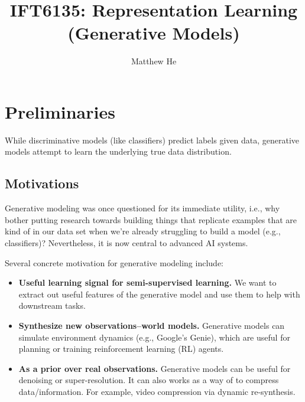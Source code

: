 \documentclass{mytufte-light}
\title{IFT6135: Representation Learning \\\qquad\qquad\qquad (Generative Models)}
\author[Matthew He]{Matthew He}
\begin{document}
\maketitle%

\begin{abstract}
\end{abstract}

\tableofcontents

\section{Preliminaries}
While discriminative models (like classifiers) predict labels given data, 
generative models attempt to learn the underlying true data distribution.

\subsection{Motivations}
Generative modeling was once questioned for its immediate utility, 
i.e., why bother putting research towards building things that replicate examples 
that are kind of in our data set when we're already struggling to build a model (e.g., classifiers)?
Nevertheless, it is now central to advanced AI systems.

Several concrete motivation for generative modeling include:
\begin{itemize}
    \item \textbf{Useful learning signal for semi-supervised learning.}
    We want to extract out useful features of the generative model and use them to help with downstream tasks.
    \item \textbf{Synthesize new observations--world models.} Generative models can
     simulate environment dynamics (e.g., Google's Genie),
     which are useful for planning or training reinforcement learning (RL) agents.
    \item \textbf{As a prior over real observations.}
    Generative models can be useful for denoising or super-resolution. It can also 
    works as a way of to compress data/information.
    For example, video compression via dynamic re-synthesis.
\end{itemize}
\end{document}
